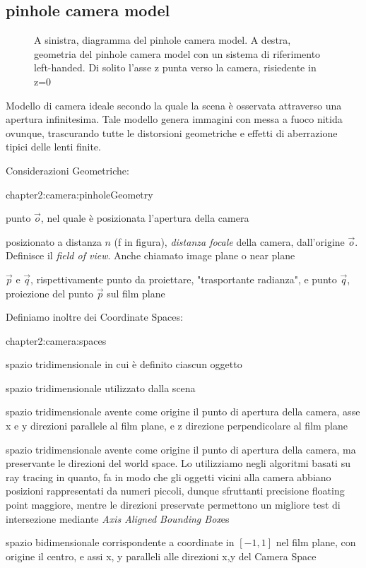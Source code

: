 \subsection{pinhole camera model}
\begin{figure}[tb]
	
	
	\caption{A sinistra, diagramma del pinhole camera model. A destra, geometria del pinhole camera model con un sistema di riferimento left-handed.
	Di solito l'asse z punta verso la camera, risiedente in z=0}
\end{figure}
Modello di camera ideale secondo la quale la scena \`e osservata attraverso una apertura infinitesima. Tale modello genera immagini con messa a fuoco
nitida ovunque, trascurando tutte le distorsioni geometriche e effetti di aberrazione tipici delle lenti finite.\footnotemark{}\par
{}
Considerazioni Geometriche:
\begin{altDescription}{chapter2:camera:pinholeGeometry}
	\item[Origine] punto $\vec{o}$, nel quale \`e posizionata l'apertura della camera
	\item[Film plane] posizionato a distanza $n$ (f in figura), \textit{distanza focale} della camera, dall'origine $\vec{o}$. 
		Definisce il \textit{field of view}. Anche chiamato image plane o near plane
	\item[Punti] $\vec{p}$ e $\vec{q}$, rispettivamente punto da proiettare, "trasportante radianza", e punto $\vec{q}$, proiezione del punto $\vec{p}$
		sul film plane
\end{altDescription}
Definiamo inoltre dei Coordinate Spaces:
\begin{altDescription}{chapter2:camera:spaces}
	\item[Object Space] spazio tridimensionale in cui \`e definito ciascun oggetto
	\item[World Space] spazio tridimensionale utilizzato dalla scena
	\item[Camera Space] spazio tridimensionale avente come origine il punto di apertura della camera, asse x e y direzioni parallele al film plane,
		e z direzione perpendicolare al film plane
	\item[Rendering Space] spazio tridimensionale avente come origine il punto di apertura della camera, ma preservante le direzioni del world space.
		Lo utilizziamo negli algoritmi basati su ray tracing in quanto, fa in modo che gli oggetti vicini alla camera abbiano posizioni rappresentati
		da numeri piccoli, dunque sfruttanti precisione floating point maggiore, mentre le direzioni preservate permettono un migliore test di 
		intersezione mediante \textit{Axis Aligned Bounding Box}es
	\item[Image Space] spazio bidimensionale corrispondente a coordinate in $[-1,1]$ nel film plane, con origine il centro, e assi x, y paralleli alle 
		direzioni x,y del Camera Space
\end{altDescription}
